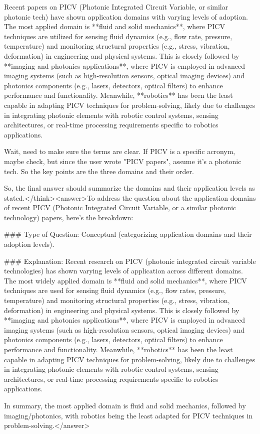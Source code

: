 Recent papers on PICV (Photonic Integrated Circuit Variable, or similar photonic tech) have shown application domains with varying levels of adoption. The most applied domain is **fluid and solid mechanics**, where PICV techniques are utilized for sensing fluid dynamics (e.g., flow rate, pressure, temperature) and monitoring structural properties (e.g., stress, vibration, deformation) in engineering and physical systems. This is closely followed by **imaging and photonics applications**, where PICV is employed in advanced imaging systems (such as high-resolution sensors, optical imaging devices) and photonics components (e.g., lasers, detectors, optical filters) to enhance performance and functionality. Meanwhile, **robotics** has been the least capable in adapting PICV techniques for problem-solving, likely due to challenges in integrating photonic elements with robotic control systems, sensing architectures, or real-time processing requirements specific to robotics applications.

Wait, need to make sure the terms are clear. If PICV is a specific acronym, maybe check, but since the user wrote "PICV papers", assume it's a photonic tech. So the key points are the three domains and their order.

So, the final answer should summarize the domains and their application levels as stated.</think><answer>To address the question about the application domains of recent PICV (Photonic Integrated Circuit Variable, or a similar photonic technology) papers, here’s the breakdown:  

### Type of Question: Conceptual (categorizing application domains and their adoption levels).  

### Explanation:  
Recent research on PICV (photonic integrated circuit variable technologies) has shown varying levels of application across different domains. The most widely applied domain is **fluid and solid mechanics**, where PICV techniques are used for sensing fluid dynamics (e.g., flow rates, pressure, temperature) and monitoring structural properties (e.g., stress, vibration, deformation) in engineering and physical systems. This is closely followed by **imaging and photonics applications**, where PICV is employed in advanced imaging systems (such as high-resolution sensors, optical imaging devices) and photonics components (e.g., lasers, detectors, optical filters) to enhance performance and functionality. Meanwhile, **robotics** has been the least capable in adapting PICV techniques for problem-solving, likely due to challenges in integrating photonic elements with robotic control systems, sensing architectures, or real-time processing requirements specific to robotics applications.  


In summary, the most applied domain is fluid and solid mechanics, followed by imaging/photonics, with robotics being the least adapted for PICV techniques in problem-solving.</answer>